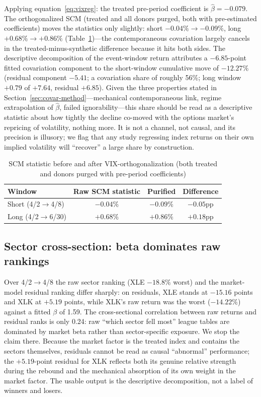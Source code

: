 \documentclass[11pt,a4paper]{article}
\begin{document}
Applying equation~\eqref{eq:vixreg}: the treated pre-period coefficient is
$\hat\beta=-0.079$. The orthogonalized SCM (treated and all donors purged,
both with pre-estimated coefficients) moves the statistics only slightly:
short $-0.04\%\to-0.09\%$, long $+0.68\%\to+0.86\%$
(Table~\ref{tab:covar})---the contemporaneous covariation largely cancels
in the treated-minus-synthetic difference because it hits both sides. The
descriptive decomposition of the event-window return attributes a
$-6.85$-point fitted covariation component to the short-window cumulative
move of $-12.27\%$ (residual component $-5.41$; a covariation share of
roughly 56\%; long window $+0.79$ of $+7.64$, residual $+6.85$). Given the three properties stated in
Section~\ref{sec:covar-method}---mechanical contemporaneous link, regime
extrapolation of $\hat\beta$, failed ignorability---this share should be
read as a descriptive statistic about how tightly the decline co-moved
with the options market's repricing of volatility, nothing more. It is not
a channel, not causal, and its precision is illusory; we flag that any
study regressing index returns on their own implied volatility will
``recover'' a large share by construction.

\begin{table}[htbp]
\centering
\caption{SCM statistic before and after VIX-orthogonalization (both
treated and donors purged with pre-period coefficients)}
\label{tab:covar}
\small
\begin{tabular}{@{}lccc@{}}
\toprule
Window & Raw SCM statistic & Purified & Difference \\
\midrule
Short (4/2$\to$4/8) & $-0.04\%$ & $-0.09\%$ & $-0.05$pp \\
Long (4/2$\to$6/30) & $+0.68\%$ & $+0.86\%$ & $+0.18$pp \\
\bottomrule
\end{tabular}
\end{table}

\subsection{Sector cross-section: beta dominates raw rankings}
\label{sec:cross-section}

Over 4/2$\to$4/8 the raw sector ranking (XLE $-18.8\%$ worst) and the
market-model residual ranking differ sharply: on residuals, XLE stands at
$-15.16$ points and XLK at $+5.19$ points, while XLK's raw return was the
worst ($-14.22\%$) against a fitted $\beta$ of 1.59. The cross-sectional
correlation between raw returns and residual ranks is only 0.24: raw
``which sector fell most'' league tables are dominated by market beta
rather than sector-specific exposure. We stop the claim there. Because the
market factor is the treated index and contains the sectors themselves,
residuals cannot be read as causal ``abnormal'' performance; the
$+5.19$-point residual for XLK reflects both its genuine relative strength
during the rebound and the mechanical absorption of its own weight in the
market factor. The usable output is the descriptive decomposition, not a
label of winners and losers.
\end{document}
